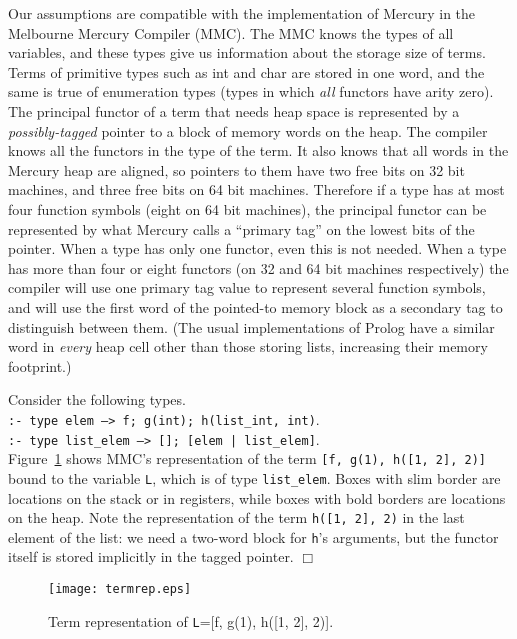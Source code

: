 \documentclass{tlp}
\newcommand{\code}[1]{{\tt#1}}
\begin{document}
Our assumptions are compatible with the implementation of Mercury
in the Melbourne Mercury Compiler (MMC).
The MMC knows the types of all variables,
and these types give us information about the storage size of terms.
Terms of primitive types such as int and char are stored in one word,
and the same is true of enumeration types
(types in which \emph{all} functors have arity zero).
The principal functor of a term that needs heap space is represented
by a \emph{possibly-tagged} pointer to a block of memory words on the heap.
The compiler knows all the functors in the type of the term.
It also knows that all words in the Mercury heap are aligned,
so pointers to them have two free bits on 32 bit machines,
and three free bits on 64 bit machines.
Therefore if a type has at most four function symbols
(eight on 64 bit machines),
the principal functor can be represented
by what Mercury calls a ``primary tag'' on the lowest bits of the pointer.
When a type has only one functor, even this is not needed.
When a type has more than four or eight functors
(on 32 and 64 bit machines respectively)
the compiler will use one primary tag value
to represent several function symbols,
and will use the first word of the pointed-to memory block
as a secondary tag to distinguish between them.
(The usual implementations of Prolog have a similar word
in \emph{every} heap cell other than those storing lists,
increasing their memory footprint.)

\begin{example} Consider the following types.\\
    \code{:- type elem ---> f; g(int); h(list\_int, int)}.\\
    \code{:- type list\_elem ---> []; [elem | list\_elem]}.\\
Figure~\ref{fig:termrep} shows MMC's representation
of the term \code{[f, g(1), h([1, 2], 2)]} bound to the variable \code{L},
which is of type \code{list\_elem}.
Boxes with slim border are locations on the stack or in registers,
while boxes with bold borders are locations on the heap.
Note the representation of the term \code{h([1, 2], 2)}
in the last element of the list:
we need a two-word block for \code{h}'s arguments,
but the functor itself is stored implicitly in the tagged pointer.
\hfill $\Box$
\label{example:termrep}
\end{example}
\begin{figure}[htp]
\centering
\texttt{[image: termrep.eps]}
\caption{Term representation of \code{L}=[f, g(1), h([1, 2], 2)].}
\label{fig:termrep}
\end{figure}
\end{document}
